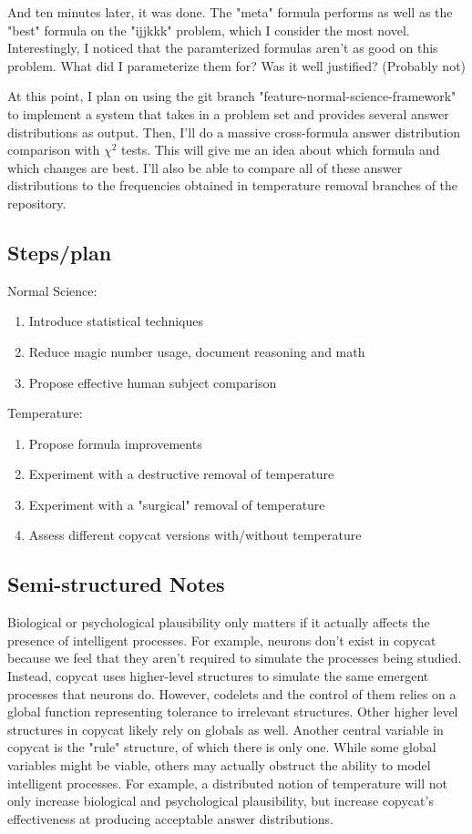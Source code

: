\documentclass[a4paper]{article}
\begin{document}
And ten minutes later, it was done.
The "meta" formula performs as well as the "best" formula on the "ijjkkk" problem, which I consider the most novel.
Interestingly, I noticed that the paramterized formulas aren't as good on this problem. What did I parameterize them for? Was it well justified?
(Probably not)

At this point, I plan on using the git branch "feature-normal-science-framework" to implement a system that takes in a problem set and provides several answer distributions as output.
Then, I'll do a massive cross-formula answer distribution comparison with $\chi^2$ tests. This will give me an idea about which formula and which changes are best.
I'll also be able to compare all of these answer distributions to the frequencies obtained in temperature removal branches of the repository.

\subsection{Steps/plan}

Normal Science:
\begin{enumerate}
	\item Introduce statistical techniques
    \item Reduce magic number usage, document reasoning and math
    \item Propose effective human subject comparison
\end{enumerate}
Temperature:
\begin{enumerate}
	\item Propose formula improvements
    \item Experiment with a destructive removal of temperature
    \item Experiment with a "surgical" removal of temperature
    \item Assess different copycat versions with/without temperature
\end{enumerate}

\subsection{Semi-structured Notes}

Biological or psychological plausibility only matters if it actually affects the presence of intelligent processes. For example, neurons don't exist in copycat because we feel that they aren't required to simulate the processes being studied. Instead, copycat uses higher-level structures to simulate the same emergent processes that neurons do. However, codelets and the control of them relies on a global function representing tolerance to irrelevant structures. Other higher level structures in copycat likely rely on globals as well. Another central variable in copycat is the "rule" structure, of which there is only one. While some global variables might be viable, others may actually obstruct the ability to model intelligent processes. For example, a distributed notion of temperature will not only increase biological and psychological plausibility, but increase copycat's effectiveness at producing acceptable answer distributions.
\end{document}
